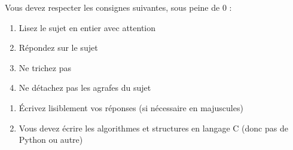 \documentclass[11pt,a4paper]{article}
\begin{document}
\MakeExamTitleDuree     %


\bigskip

Vous devez respecter les consignes suivantes, sous peine de 0 :

\begin{table}[ht!]
  \begin{minipage}{0.45\textwidth}

\begin{enumerate}[label=\Roman*)]
\item Lisez le sujet en entier avec attention
\item Répondez sur le sujet
\item Ne trichez pas
\item Ne détachez pas les agrafes du sujet
\end{enumerate}

  \end{minipage}
  \hfillx
  \begin{minipage}{0.55\textwidth}

\begin{enumerate}[label=\Roman*),start=5]
\item \'Ecrivez lisiblement vos réponses (si nécessaire en majuscules)
\item Vous devez écrire les algorithmes et structures en langage C (donc pas de Python ou autre)
\end{enumerate}

  \end{minipage}
\end{table}

\end{document}
